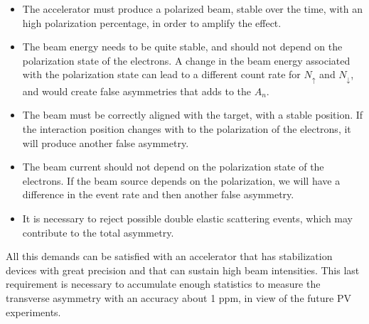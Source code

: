 \begin{itemize}
\item The accelerator must produce a polarized beam, stable over the time, with an high polarization percentage, in order to amplify the effect.
\item The beam energy needs to be quite stable, and should not depend on the polarization state of the electrons. A change in the beam energy associated with the polarization state can lead to a different count rate for $N_{\uparrow}$ and $N_{\downarrow}$, and would create false asymmetries that adds to the $A_{n}$.
\item The beam must be correctly aligned with the target, with a stable position. If the interaction position changes with to the polarization of the electrons, it will produce another false asymmetry.
\item The beam current should not depend on the polarization state of the electrons. If the beam source depends on the polarization, we will have a difference in the event rate and then another false asymmetry.
\item It is necessary to reject possible double elastic scattering events, which may contribute to the total asymmetry. 
\end{itemize}

All this demands can be satisfied with an accelerator that has stabilization devices with great precision and that can sustain high beam intensities. This last requirement is necessary to accumulate enough statistics to measure the transverse asymmetry with an accuracy about 1 ppm, in view of the future PV experiments.
